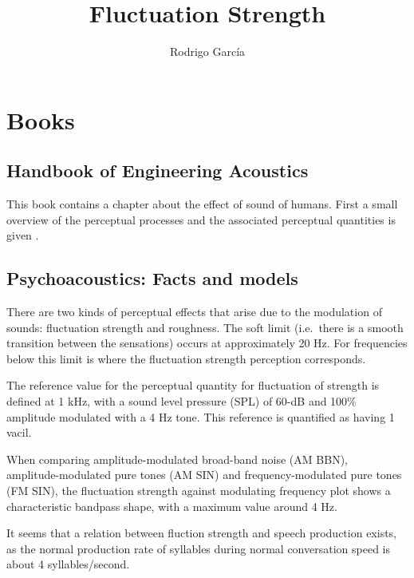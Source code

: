 \documentclass[a4paper,10pt]{article}
\begin{document}
\title{Fluctuation Strength}
\author{Rodrigo García}
\maketitle

\section{Books}

\subsection{Handbook of Engineering Acoustics}

This book contains a chapter about the effect of sound of humans. First a small
overview of the perceptual processes and the associated perceptual quantities is
given \cite[p.~72]{Fastl2007}. 

\subsection{Psychoacoustics: Facts and models}

There are two kinds of perceptual effects that arise due to the modulation of
sounds: fluctuation strength and roughness. The soft limit (i.e.\ there is a
smooth transition between the sensations) occurs at approximately 20 Hz. For
frequencies below this limit is where the fluctuation strength perception
corresponds.

The reference value for the perceptual quantity for fluctuation of strength is
defined at 1 kHz, with a sound level pressure (SPL) of 60-dB and 100\% amplitude
modulated with a 4 Hz tone. This reference is quantified as having 1 vacil.

When comparing amplitude-modulated broad-band noise (AM BBN), \\
amplitude-modulated pure tones (AM SIN) and frequency-modulated pure tones
(FM SIN), the fluctuation strength against modulating frequency plot shows a
characteristic bandpass shape, with a maximum value around 4 Hz.

It seems that a relation between fluction strength and speech production exists,
as the normal production rate of syllables during normal conversation speed is
about 4 syllables/second.



\end{document}
